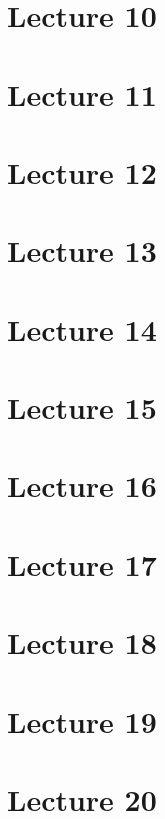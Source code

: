 \documentclass[english,12pt]{article}
\theoremstyle{plain}
\theoremstyle{definition}
\theoremstyle{definition} %
\begin{document}
\section*{Lecture 10}
\section*{Lecture 11}
\section*{Lecture 12}
\section*{Lecture 13}
\section*{Lecture 14}
\section*{Lecture 15}
\section*{Lecture 16}
\section*{Lecture 17}
\section*{Lecture 18}
\section*{Lecture 19}
\section*{Lecture 20}
\end{document}
